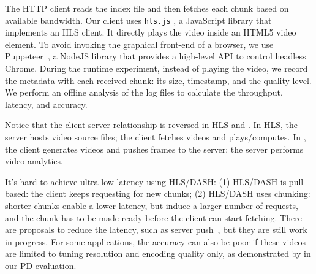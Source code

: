 \documentclass[twocolumn, 9pt]{article}
\begin{document}
 The HTTP client reads the index file and then fetches each
chunk based on available bandwidth. Our client uses \texttt{hls.js}
\cite{hls.js}, a JavaScript library that implements an HLS client. It directly
plays the video inside an HTML5 video element. To avoid invoking the graphical
front-end of a browser, we use Puppeteer~\cite{puppeteer}, a NodeJS library that
provides a high-level API to control headless Chrome. During the runtime
experiment, instead of playing the video, we record the metadata with each
received chunk: its size, timestamp, and the quality level. We perform an
offline analysis of the log files to calculate the throughput, latency, and
accuracy.

Notice that the client-server relationship is reversed in HLS and \sysname{}. In
HLS, the server hosts video source files; the client fetches videos and
plays/computes. In \sysname{}, the client generates videos and pushes frames to
the server; the server performs video analytics.

\vspace{1em}
 It's hard to achieve
ultra low latency using HLS/DASH: (1) HLS/DASH is pull-based: the client keeps
requesting for new chunks; (2) HLS/DASH uses chunking: shorter chunks enable a
lower latency, but induce a larger number of requests, and the chunk has to be
made ready before the client can start fetching. There are proposals to reduce
the latency, such as server push~\cite{wei2014low}, but they are still work in
progress. For some applications, the accuracy can also be poor if these videos
are limited to tuning resolution and encoding quality only, as demonstrated by
in our PD evaluation.


{\footnotesize 
  }
\end{document}
